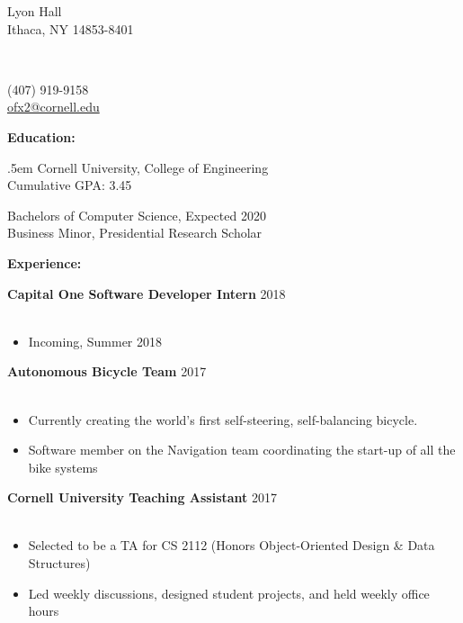 \documentclass[12pt]{article}
\makeatletter
\newcommand{\name}{OLIVIA XIANG}
\newcommand{\addressPartOne}{402 Lyon Hall}
\newcommand{\addressPartTwo}{Ithaca, NY 14853-8401}
\newcommand{\phoneNumber}{(407) 919-9158}
\newcommand{\email}{ofx2@cornell.edu}
\newcommand{\gpa}{3.45}
\newcommand{\header}[5]{
	\begin{minipage}{0.3\linewidth} 
		\fontsize{12}{0} \selectfont
		#2\\[.25em]
		#3\\
		\vspace{1em} 
	\end{minipage}
	\vspace{-.75em}
	\begin{minipage}{0.4\linewidth} 
		\fontsize{16}{0} \selectfont
		\center{\textbf{#1}}\\
		\vspace{2em} 
	\end{minipage}
	\begin{minipage}{0.25\linewidth}
		\begin{flushright}
			\fontsize{12}{0} \selectfont
			#4\\[.25em]
			#5\\
			\vspace{1em} 
		\end{flushright}
	\end{minipage}
	\makebox[\linewidth]{\rule{100em}{.4pt}}
	\vspace{-.4em}
}
\newcommand{\textBody}[3]{
	\makeCaption{#1}{#2}

	\begin{minipage}{0.97\linewidth} 
		\begin{adjustwidth}{.5em}{}
			\fontsize{11}{13} \selectfont 
			#3
		\end{adjustwidth}
	\end{minipage}
	\vspace{.75em}
}
\newcommand{\captionSplitLeft}[7]{
	\makeCaption{#1}{#2}
	
	\splitLeft{#3}{#4}{#5}{#6}{#7}
}
\newcommand{\splitLeft}[5]{
	\begin{minipage}{#3\linewidth}
		\begin{adjustwidth}{#1}{}
			\fontsize{11}{12} \selectfont
			#2
		\end{adjustwidth}
	\end{minipage}
	\begin{minipage}{#5\linewidth}
		\begin{flushleft}
			\fontsize{11}{12} \selectfont 
			#4
		\end{flushleft}
	\end{minipage} 
	\vspace{1em}
}
\newcommand{\makeCaption}[2]{
	\fontsize{14}{0} \selectfont
	\textbf{#1:}
	\vspace{#2}
}
\newcommand{\group}[1]{
	\fontsize{14}{0} \selectfont
	\textbf{#1}
}
\newcommand{\jobCaption}[2]{
	\hspace{0.3em}
	\fontsize{12}{13} \selectfont
	\textbf{#1}
	\fontsize{11}{12} \selectfont 
	\hfill{#2}\\[.1em]
}
\makeatother
\begin{document}
	\header	{\name}
		{\addressPartOne}
		{\addressPartTwo}
		{\phoneNumber}
		{\href{mailto:\email}{\email}}


\begin{comment}
	\textBody	{Objective}
				{.25em}
				{Looking for opportunities that allow me to enhance my engineering skills with a focus on designing and implementing cutting-edge technical solutions to real-world problems.}
\end{comment}


	\captionSplitLeft{Education}{.4em}{.5em}
		{Cornell University, College of Engineering\\
			Cumulative GPA: \gpa}{.5}
		{Bachelors of Computer Science, Expected 2020\\
			Business Minor, Presidential Research Scholar}{.5}
	\vspace{-.4em}

	\group{Experience:}
	\vspace{.4em}
	
	\jobCaption{Capital One Software Developer Intern}{2018}\\[-1.75em]
	\begin{itemize}[leftmargin=1.5cm]
	\setlength\itemsep{-.25em}
	\fontsize{11}{0} \selectfont
	
	\item Incoming, Summer 2018
	\end{itemize}
	\vspace{.7em}
	
	
	\jobCaption{Autonomous Bicycle Team}{2017}\\[-1.75em]
	\begin{itemize}[leftmargin=1.5cm]
	\setlength\itemsep{-.25em}
	\fontsize{11}{0} \selectfont
	
	\item Currently creating the world's first self-steering, self-balancing bicycle. 
	\item Software member on the Navigation team coordinating the start-up of all the bike systems
	\end{itemize}
	\vspace{.7em}
	
	\jobCaption{Cornell University Teaching Assistant}{2017}\\[-1.75em]
	\begin{itemize}[leftmargin=1.5cm]
		\setlength\itemsep{-.25em}
		\fontsize{11}{0} \selectfont 
	
		\item Selected to be a TA for CS 2112 (Honors Object-Oriented Design \& Data Structures)
		\item Led weekly discussions, designed student projects, and held weekly office hours
	\end{itemize}
	\vspace{.7em}
\end{document}
